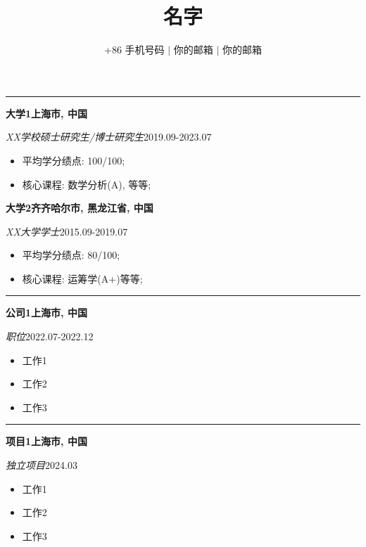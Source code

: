 \documentclass[12pt, a4paper, oneside]{ctexart}
\title{\textbf{名字}\vspace{-0.8em}}
\author{+86 手机号码 $\lvert$ 你的邮箱 $\lvert$ 你的邮箱}
\date{}
\begin{document}
\maketitle
\vspace{-2em}

\vspace{-0.6em}
\noindent\rule{\textwidth}{1pt}

\noindent \textbf{大学1}\hfill \textbf{上海市, 中国}

\textit{XX学校硕士研究生/博士研究生}\hfill 2019.09-2023.07


\begin{itemize}
	\item 平均学分绩点: 100/100;
	\item 核心课程: 数学分析(A), 等等;
\end{itemize}

\noindent \textbf{大学2}\hfill \textbf{齐齐哈尔市, 黑龙江省, 中国}

\textit{XX大学学士}\hfill 2015.09-2019.07

\begin{itemize}
	\item 平均学分绩点: 80/100;
	\item 核心课程: 运筹学(A+)等等;
\end{itemize}

\vspace{0.5em}

\vspace{-0.6em}
\noindent\rule{\textwidth}{1pt}
\noindent \textbf{公司1}\hfill \textbf{上海市, 中国}

\textit{职位}\hfill 2022.07-2022.12
\begin{itemize}
	\item 工作1
	\item 工作2
	\item 工作3
\end{itemize}

\vspace{-0.6em}
\noindent\rule{\textwidth}{1pt}

\noindent \textbf{项目1}\hfill \textbf{上海市, 中国}

\textit{独立项目}\hfill 2024.03

\begin{itemize}
	\item 工作1
	\item 工作2
	\item 工作3
\end{itemize}
\end{document}
